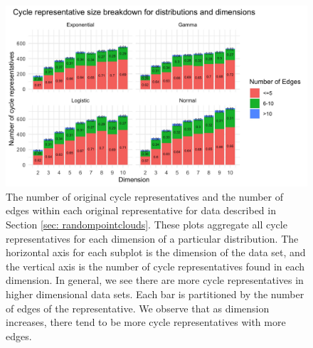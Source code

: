 \documentclass[utf8]{formatting_stuff/frontiersFPHY}
\newcommand{\se}{Section }
\theoremstyle{plain}
\theoremstyle{definition}
\begin{document}
\newpage 
 \begin{figure}[h!]
\begin{center}
\includegraphics[width=1\textwidth]{figures/generator_breakdown.jpg} 
\end{center}
\caption{The number of original cycle representatives and the number of edges within each original representative for data described in \se \ref{sec: randompointclouds}. These plots aggregate all cycle representatives for each dimension of a particular distribution. The horizontal axis for each subplot is the dimension of the data set, and the vertical axis is the number of cycle representatives found in each dimension. In general, we see there are more cycle representatives in higher dimensional data sets. Each bar is partitioned by the number of edges of the representative. We observe that as dimension increases, there tend to be more cycle representatives with more edges.  
}\label{fig:gen_num_breakdown}
\end{figure}



\newpage 
 
\end{document}
